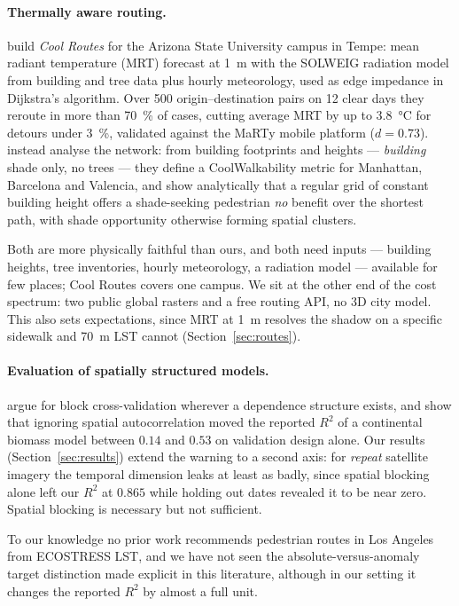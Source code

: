 \documentclass[10pt]{article}   %
\begin{document}
\paragraph{Thermally aware routing.}
\citet{buo2026coolroutes} build \emph{Cool Routes} for the Arizona State University campus
in Tempe: mean radiant temperature (MRT) forecast at \SI{1}{\metre} with the SOLWEIG
radiation model from building and tree data plus hourly meteorology, used as edge impedance
in Dijkstra's algorithm. Over 500 origin--destination pairs on 12 clear days they reroute in
more than \SI{70}{\percent} of cases, cutting average MRT by up to \SI{3.8}{\celsius} for
detours under \SI{3}{\percent}, validated against the MaRTy mobile platform ($d = 0.73$).
\citet{wolf2025coolwalks} instead analyse the network: from building footprints and heights
--- \emph{building} shade only, no trees --- they define a CoolWalkability metric for
Manhattan, Barcelona and Valencia, and show analytically that a regular grid of constant
building height offers a shade-seeking pedestrian \emph{no} benefit over the shortest path,
with shade opportunity otherwise forming spatial clusters.

Both are more physically faithful than ours, and both need inputs --- building heights, tree
inventories, hourly meteorology, a radiation model --- available for few places; Cool Routes
covers one campus. We sit at the other end of the cost spectrum: two public global rasters
and a free routing API, no 3D city model. This also sets expectations, since MRT at
\SI{1}{\metre} resolves the shadow on a specific sidewalk and \SI{70}{\metre} LST cannot
(Section~\ref{sec:routes}).

\paragraph{Evaluation of spatially structured models.}
\citet{roberts2017crossvalidation} argue for block cross-validation wherever a dependence
structure exists, and \citet{ploton2020spatial} show that ignoring spatial autocorrelation
moved the reported $R^2$ of a continental biomass model between $0.14$ and $0.53$ on
validation design alone. Our results (Section~\ref{sec:results}) extend the warning to a
second axis: for \emph{repeat} satellite imagery the temporal dimension leaks at least as
badly, since spatial blocking alone left our $R^2$ at $0.865$ while holding out dates
revealed it to be near zero. Spatial blocking is necessary but not sufficient.

To our knowledge no prior work recommends pedestrian routes in Los Angeles from ECOSTRESS
LST, and we have not seen the absolute-versus-anomaly target distinction made explicit in
this literature, although in our setting it changes the reported $R^2$ by almost a full unit.
\end{document}
